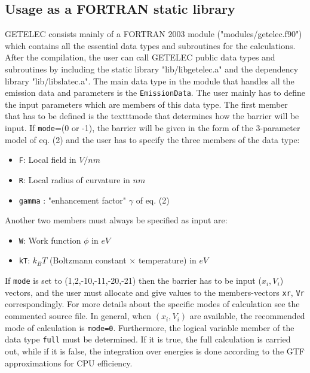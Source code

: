 \documentclass[notitlepage
]{revtex4-1}
\begin{document}
\subsection{Usage as a FORTRAN static library}   
\label{fortran}
GETELEC consists mainly of a FORTRAN 2003 module ("modules/getelec.f90") which contains all the essential data types and subroutines for the calculations. After the compilation, the user can call GETELEC public data types and subroutines by including the static library "lib/libgetelec.a" and the dependency library "lib/libslatec.a". The main data type in the module that handles all the emission data and parameters is the \texttt{EmissionData}. The user mainly has to define the input parameters which are members of this data type. The first member that has to be defined is the texttt{mode} that determines how the barrier will be input. If \texttt{mode}=(0 or -1), the barrier will be given in the form of the 3-parameter model of eq. (2) and the user has to specify the three members of the data type:
\begin{itemize}
	\item \texttt{F}: Local field in $V/nm$
	\item \texttt{R}: Local radius of curvature in $nm$
	\item \texttt{gamma} : "enhancement factor" $\gamma$ of eq. (2) 
\end{itemize} 
Another two members must always be specified as input are:
\begin{itemize}
	\item \texttt{W}: Work function $\phi$ in $eV$
	\item \texttt{kT}: $k_BT$ (Boltzmann constant $\times$ temperature) in $eV$
\end{itemize}
If \texttt{mode} is set to (1,2,-10,-11,-20,-21) then the barrier has to be input ($x_i,V_i$) vectors, and the user must allocate and give values to the members-vectors \texttt{xr}, \texttt{Vr} correspondingly. For more details about the specific modes of calculation see the commented source file. In general, when $(x_i,V_i)$ are available, the recommended mode of calculation is \texttt{mode=0}. Furthermore, the logical variable member of the data type \texttt{full} must be determined. If it is true, the full calculation is carried out, while if it is false, the integration over energies is done according to the GTF approximations for CPU efficiency.
\end{document}
